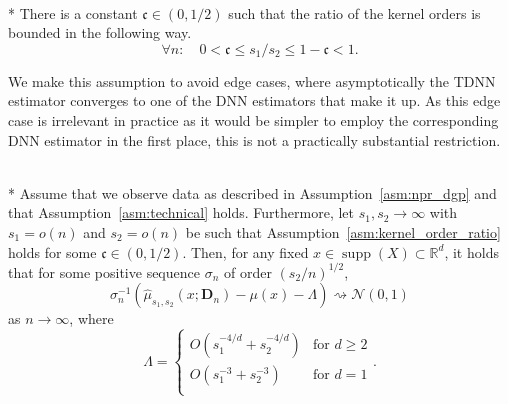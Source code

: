 \begin{boxD}
	\begin{asm}\label{asm:kernel_order_ratio}\mbox{}\\*
		There is a constant $\mathfrak{c} \in (0,1/2)$ such that the ratio of the kernel orders is bounded in the following way.
		\begin{equation}
			\forall n: \quad 0 < \mathfrak{c} \leq s_1 / s_2 \leq 1 - \mathfrak{c} < 1.
		\end{equation}
	\end{asm}
\end{boxD}
We make this assumption to avoid edge cases, where asymptotically the TDNN estimator converges to one of the DNN estimators that make it up.
As this edge case is irrelevant in practice as it would be simpler to employ the corresponding DNN estimator in the first place, this is not a practically substantial restriction.
\begin{boxD}
	\begin{thm}\label{thm:dem3}\mbox{}\\*
		Assume that we observe data as described in Assumption~\ref{asm:npr_dgp} and that Assumption~\ref{asm:technical} holds.
		Furthermore, let $s_1, s_2 \rightarrow \infty$ with $s_1 = o(n)$ and $s_2 = o(n)$ be such that Assumption~\ref{asm:kernel_order_ratio} holds for some $\mathfrak{c} \in (0, 1/2)$.
		Then, for any fixed $x \in \operatorname{supp}(X) \subset \mathbb{R}^d$, it holds that for some positive sequence $\sigma_n$ of order $(s_2/n)^{1/2}$,
		\begin{equation}
			\sigma_n^{-1} \left(\hat{\mu}_{s_1, s_2}\left(x; \mathbf{D}_n\right) - \mu(x) - \Lambda\right) \rightsquigarrow \mathcal{N}(0,1)
		\end{equation}
		as $n \rightarrow \infty$, where
		\begin{equation*}
			\Lambda = \begin{cases}
				O\left(s_1^{-4/d} + s_2^{-4/d}\right) & \text{for } d \geq 2 \\
				O\left(s_1^{-3} + s_2^{-3}\right)     & \text{for } d = 1    \\
			\end{cases} .
		\end{equation*}
	\end{thm}
\end{boxD}

